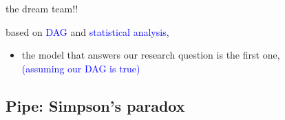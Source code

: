 %
%
\begin{lhframe}[rhgraphic={\texttt{[image: pipe2\_reg1.png]}}]
	{the dream team!!}
	
	based on \textcolor{blue}{DAG} and \textcolor{blue}{statistical analysis},
	\begin{itemize}
		\item the model that answers our research question is the first one, \\
		{\small \textcolor{blue}{(assuming our DAG is true)} }
	\end{itemize}
\end{lhframe}
%
%
\subsection{Pipe: Simpson's paradox}
%
%
\begin{frame}[t, negative]
	\subsectionpage
\end{frame}
%
%
